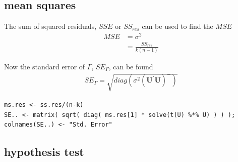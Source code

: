 \documentclass[10pt, twoside, openleft]{article}
\begin{document}
\begin{center}
\subsection{mean squares}
\vspace{-3ex}
\end{center}

\noindent
The sum of squared residuals, $SSE$ or $SS_{res}$ can be used to find the $MSE$
\begin{equation*}
\begin{aligned}
MSE & = \sigma^{2} \\
    & = \frac{ SS_{res} }{ k \left( n-1 \right) }
\end{aligned}
\end{equation*}
\smallskip

\noindent
Now the standard error of $\Gamma$, $SE_{\Gamma}$, can be found
\begin{equation*}
\begin{aligned}
SE_{\Gamma} = \sqrt{ diag(\sigma^{2} ( \mathbf{U}^{'} \mathbf{U})^{-} ) }
\end{aligned}
\end{equation*}
\smallskip

\begin{verbatim}
ms.res <- ss.res/(n-k)
SE.. <- matrix( sqrt( diag( ms.res[1] * solve(t(U) %*% U) ) ) );  colnames(SE..) <- "Std. Error"
\end{verbatim}

\begin{center}
\subsection{hypothesis test}
\vspace{-3ex}
\end{center}
\end{document}
